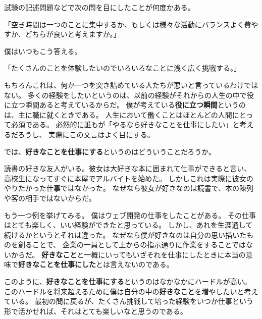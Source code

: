 \documentclass[]{tarticle}
\begin{document}
試験の記述問題などで次の問を目にしたことが何度かある。

「空き時間は一つのことに集中するか、もしくは様々な活動にバランスよく費やすか、どちらが良いと考えますか。」

僕はいつもこう答える。

「たくさんのことを体験したいのでいろいろなことに浅く広く挑戦する。」

もちろんこれは、何か一つを突き詰めている人たちが悪いと言っているわけではない。
多くの経験をしたいというのは、以前の経験がそれからの人生の中で役に立つ瞬間あると考えているからだ。
僕が考えている{\bf 役に立つ瞬間}というのは、主に職に就くときである。
人生において働くことはほとんどの人間にとって必須である。
必然的に誰もが「やるなら好きなことを仕事にしたい」と考えるだろうし、
実際にこの文言はよく目にする。

では、{\bf 好きなことを仕事にする}というのはどういうことだろうか。

読書の好きな友人がいる。彼女は大好きな本に囲まれて仕事ができると言い、
高校生になってすぐに本屋でアルバイトを始めた。
しかしこれは実際に彼女のやりたかった仕事ではなかった。
なぜなら彼女が好きなのは読書で、本の陳列や客の相手ではないからだ。

もう一つ例を挙げてみる。
僕はウェブ開発の仕事をしたことがある。
その仕事はとても楽しく、いい経験ができたと思っている。
しかし、あれを生涯通して続けるかというとそれは違った。
なぜなら僕が好きなのは自分の思い描いたものを創ることで、
企業の一員として上からの指示通りに作業をすることではないからだ。
{\bf 好きなこと}と一概にいってもいざそれを仕事にしたときに本当の意味で{\bf 好きなことを仕事にした}とは言えないのである。

このように、{\bf 好きなことを仕事にする}というのはなかなかにハードルが高い。
このハードルを将来超えるために僕は自分の中の{\bf 好きなこと}を増やしたいと考えている。
最初の問に戻るが、たくさん挑戦して培った経験をいつか仕事という形で活かせれば、それはとても楽しいなと思うのである。
\end{document}
